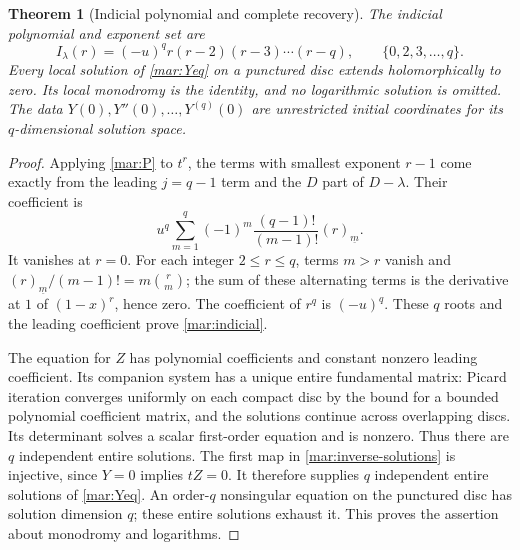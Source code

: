 \documentclass[11pt]{article}
\newtheorem{theorem}{Theorem}
\begin{document}
\begin{theorem}[Indicial polynomial and complete recovery]\label{mar:scalar-theorem}
The indicial polynomial and exponent set are
\begin{equation}\tag{MAR8}\label{mar:indicial}
 I_\lambda(r)=(-u)^q r(r-2)(r-3)\cdots(r-q),
 \qquad\{0,2,3,\ldots,q\}.
\end{equation}
Every local solution of \eqref{mar:Yeq} on a punctured disc extends
holomorphically to zero. Its local monodromy is the identity, and no
logarithmic solution is omitted. The data $Y(0),Y''(0),\ldots,Y^{(q)}(0)$
are unrestricted initial coordinates for its $q$-dimensional solution space.
\end{theorem}
\begin{proof}
Applying \eqref{mar:P} to $t^r$, the terms with smallest exponent
$r-1$ come exactly from the leading $j=q-1$ term and the $D$ part
of $D-\lambda$. Their coefficient is
\[
 u^q\sum_{m=1}^{q}(-1)^m\frac{(q-1)!}{(m-1)!}(r)_{\underline m}.
\]
It vanishes at $r=0$. For each integer $2\le r\le q$, terms
$m>r$ vanish and
$(r)_{\underline m}/(m-1)!=m\binom rm$; the sum of these
alternating terms is the derivative at $1$ of $(1-x)^r$, hence
zero. The coefficient of $r^q$ is $(-u)^q$. These $q$ roots and
the leading coefficient prove \eqref{mar:indicial}.

The equation for $Z$ has polynomial coefficients and constant nonzero
leading coefficient. Its companion system has a unique entire
fundamental matrix: Picard iteration converges uniformly on each compact
disc by the bound for a bounded polynomial coefficient matrix, and the
solutions continue across overlapping discs. Its determinant solves a
scalar first-order equation and is nonzero. Thus there are $q$
independent entire solutions. The first map in
\eqref{mar:inverse-solutions} is injective, since $Y=0$ implies
$tZ=0$. It therefore supplies $q$ independent entire solutions of
\eqref{mar:Yeq}. An order-$q$ nonsingular equation on the punctured
disc has solution dimension $q$; these entire solutions exhaust it.
This proves the assertion about monodromy and logarithms.


\end{proof}
\end{document}
